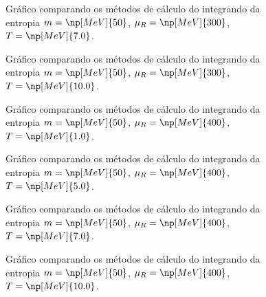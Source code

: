 \begin{figure}
	
	\caption{Gráfico comparando os métodos de cálculo do integrando da entropia $m = \np[MeV]{50}$, $\mu_R = \np[MeV]{300}$, $T = \np[MeV]{7.0}$. \protect}
	\label{Fig:Test_entropy_integrand_calc_0_3_2}
\end{figure}

\begin{figure}
	
	\caption{Gráfico comparando os métodos de cálculo do integrando da entropia $m = \np[MeV]{50}$, $\mu_R = \np[MeV]{300}$, $T = \np[MeV]{10.0}$. \protect}
	\label{Fig:Test_entropy_integrand_calc_0_3_3}
\end{figure}

\begin{figure}
	
	\caption{Gráfico comparando os métodos de cálculo do integrando da entropia $m = \np[MeV]{50}$, $\mu_R = \np[MeV]{400}$, $T = \np[MeV]{1.0}$. \protect}
	\label{Fig:Test_entropy_integrand_calc_0_4_0}
\end{figure}

\begin{figure}
	
	\caption{Gráfico comparando os métodos de cálculo do integrando da entropia $m = \np[MeV]{50}$, $\mu_R = \np[MeV]{400}$, $T = \np[MeV]{5.0}$. \protect}
	\label{Fig:Test_entropy_integrand_calc_0_4_1}
\end{figure}

\begin{figure}
	
	\caption{Gráfico comparando os métodos de cálculo do integrando da entropia $m = \np[MeV]{50}$, $\mu_R = \np[MeV]{400}$, $T = \np[MeV]{7.0}$. \protect}
	\label{Fig:Test_entropy_integrand_calc_0_4_2}
\end{figure}

\begin{figure}
	
	\caption{Gráfico comparando os métodos de cálculo do integrando da entropia $m = \np[MeV]{50}$, $\mu_R = \np[MeV]{400}$, $T = \np[MeV]{10.0}$. \protect}
	\label{Fig:Test_entropy_integrand_calc_0_4_3}
\end{figure}

